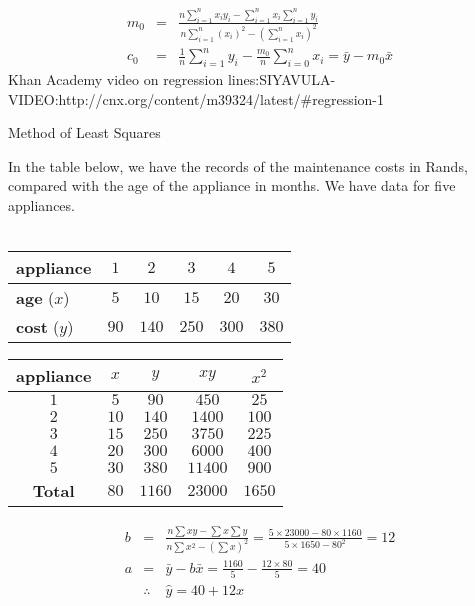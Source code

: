 \begin{eqnarray*}
m_0&=&\frac{n\sum^n_{i=1}x_iy_i-\sum^n_{i=1}x_i\sum^n_{i=1}y_i}{n\sum^n_{i=1}(x_i)^2-\left(\sum^n_{i=1}x_i\right )^2}\\
c_0&=&\frac{1}{n}\sum^n_{i=1}y_i-\frac{m_0}{n}\sum^n_{i=0}x_i=\bar{y}-m_0\bar{x}
\end{eqnarray*}
Khan Academy video on regression lines:SIYAVULA-VIDEO:http://cnx.org/content/m39324/latest/#regression-1
\begin{wex}{Method of Least Squares}
{In the table below, we have the records of the maintenance costs in Rands, compared with the age of the appliance in months. We have data for five appliances.\\ \\
\begin{center}
\begin{tabular}{|l|c|c|c|c|c|}\hline
\textbf{appliance} & $1$ & $2$ & $3$ & $4$ & $5$ \\\hline
\textbf{age} ($x$) & $5$ & $10$ & $15$ & $20$ & $30$ \\\hline
\textbf{cost} ($y$)& $90$ & $140$ & $250$ & $300$ & $380$ \\\hline
\end{tabular}
\end{center}
}

{
\begin{center}
\begin{tabular}{|c|c|c|c|c|}\hline
\textbf{appliance}& $x$ & $y$ & $xy$ & $x^2$\\\hline
$1$ & $5$ & $90$ & $450$ & $25$ \\\hline
$2$ & $10$ & $140$ & $1400$ & $100$\\\hline
$3$ & $15$ & $250$ & $3750$ & $225$ \\\hline
$4$ & $20$ & $300$ & $6000$ & $400$\\\hline
$5$ & $30$ & $380$ & $11400$ & $900$ \\\hline
\textbf{Total} & $80$ & $1160$ & $23000$ & $1650$ \\\hline
\end{tabular}
\end{center}
\begin{eqnarray*}
b &=& \frac{n \sum{xy} - \sum{x}\sum{y}}{n\sum{x^2} - \left(\sum{x}\right)^2} = \frac{5\times 23000 - 80\times 1160}{5\times 1650 - 80^2} = 12\\
a &=& \bar{y} - b\bar{x} = \frac{1160}{5} - \frac{12\times 80}{5} = 40\\
&\therefore& \hat{y} = 40 + 12x
\end{eqnarray*}
}
\end{wex}

